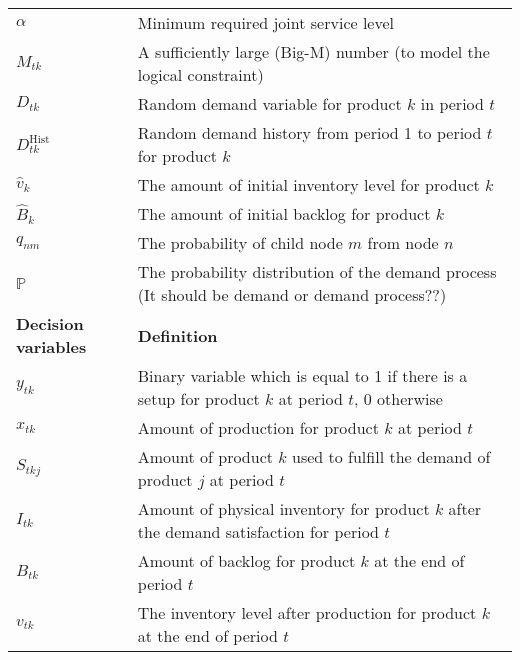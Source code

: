 \documentclass[10pt]{article}
\newcommand{\ti}{t} %
\newcommand{\ka}{k} %
\newcommand{\jey}{j} %
\newcommand{\Bi}{B} %
\newcommand{\Vi}{v} %
\newcommand{\Es}{S} %
\newcommand{\x}{x} %
\newcommand{\y}{y} %
\newcommand{\InvPos}{inventory level after production }
\newcommand{\Csub}{\mathcal{K}^+_k}
\newcommand{\Psub}{\mathcal{K}^-_k}
\newcommand{\cred}{\color{red!65!black}}
\begin{document}
\begin{table}[H]
\begin{adjustbox}{width=1\textwidth,center=\textwidth}
\begin{tabular}{ll}
$\alpha$  & Minimum required joint service level \\ 
$M_{\ti \ka}$  & A sufficiently large (Big-M) number (to model the logical constraint) \\ 
${D}_{\ti \ka}$ & Random demand variable for product $\ka $ in period $\ti$  \\ 
${D}^\text{Hist}_{\ti \ka}$ & Random demand history from period 1 to period $\ti$ for product $\ka $  \\ 
$\hat{\Vi}_{\ka} $&  The amount of initial inventory level for product $\ka$ \\
$\hat{\Bi}_{\ka} $&  The amount of initial backlog for product $\ka$   \\
$q_{nm} $&  The probability of child node $m$ from node $n$  \\
$\mathbb{P} $&  The probability distribution of the demand process {\cred(It should be demand or demand process??)}\\ 
\midrule
{\textbf {Decision variables}} & {\textbf {Definition}} \\ \midrule
$\y_{\ti \ka}$ & Binary variable which is equal to 1 if there is a setup for product $k$ at period $\ti$, 0 otherwise \\ 
$\x_{\ti \ka}$ & Amount of production for product $\ka$  at period $\ti$  \\ 
$\Es_{\ti \ka \jey}$ & Amount of product $\ka$  used to fulfill the demand of product $\jey$  at period $\ti$   \\
${I}_{\ti \ka}$ & Amount of physical inventory for product $k$ after the demand satisfaction for period $\ti$  \\
${\Bi}_{\ti \ka}$ & Amount of backlog for product $k$ at the end of period $\ti$  \\
${\Vi}_{\ti \ka}$ & The \InvPos for product $\ka$ at the end of period $\ti$  \\
 \bottomrule
\end{tabular}
\end{adjustbox}
 \label{tab:Sub_parameters}
\end{table}
\end{document}
